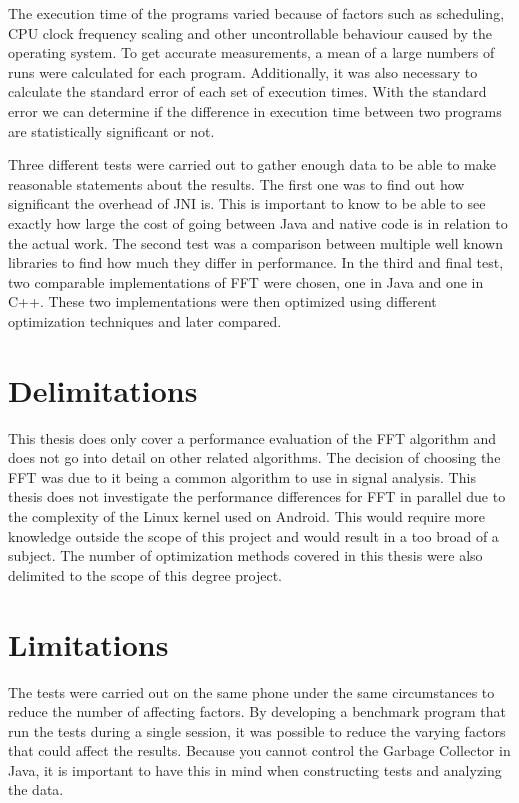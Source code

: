 The execution time of the programs varied because of factors such as scheduling, CPU clock frequency scaling and other uncontrollable behaviour caused by the operating system. To get accurate measurements, a mean of a large numbers of runs were calculated for each program. Additionally, it was also necessary to calculate the standard error of each set of execution times. With the standard error we can determine if the difference in execution time between two programs are statistically significant or not.

Three different tests were carried out to gather enough data to be able to make reasonable statements about the results. The first one was to find out how significant the overhead of JNI is. This is important to know to be able to see exactly how large the cost of going between Java and native code is in relation to the actual work. The second test was a comparison between multiple well known libraries to find how much they differ in performance. In the third and final test, two comparable implementations of FFT were chosen, one in Java and one in C++. These two implementations were then optimized using different optimization techniques and later compared.

\section{Delimitations}
This thesis does only cover a performance evaluation of the FFT algorithm and does not go into detail on other related algorithms. The decision of choosing the FFT was due to it being a common algorithm to use in signal analysis. This thesis does not investigate the performance differences for FFT in parallel due to the complexity of the Linux kernel used on Android. This would require more knowledge outside the scope of this project and would result in a too broad of a subject. The number of optimization methods covered in this thesis were also delimited to the scope of this degree project.

\section{Limitations}
The tests were carried out on the same phone under the same circumstances to reduce the number of affecting factors. By developing a benchmark program that run the tests during a single session, it was possible to reduce the varying factors that could affect the results. Because you cannot control the Garbage Collector in Java, it is important to have this in mind when constructing tests and analyzing the data.

